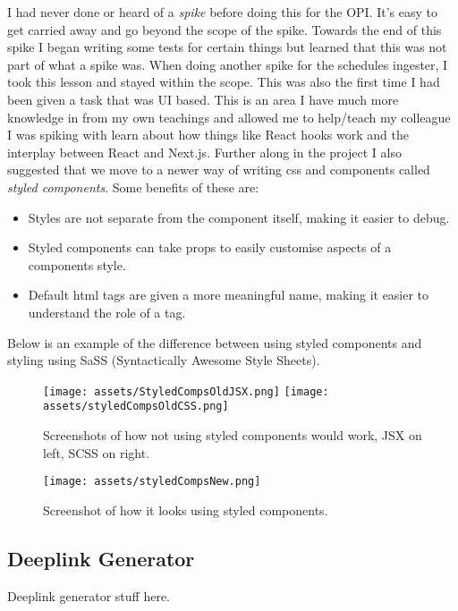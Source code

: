   \vspace{0.2cm}

  I had never done or heard of a \textit{spike} before doing this for the OPI. It's easy to get carried away and go beyond the scope of the spike.
  Towards the end of this spike I began writing some tests for certain things but learned that this was not part of what a spike was. When doing 
  another spike for the schedules ingester, I took this lesson and stayed within the scope. This was also the first time I had been given a task that
  was UI based. 
  This is an area I have much more knowledge in from my own teachings and allowed me to help/teach my colleague I was spiking with learn
  about how things like React hooks work and the interplay between React and Next.js.
  Further along in the project I also suggested that we move to a newer way of writing css and components called \textit{styled components}. Some benefits of
  these are:
  \begin{itemize}
    \item Styles are not separate from the component itself, making it easier to debug.
    \item Styled components can take props to easily customise aspects of a components style.
    \item Default html tags are given a more meaningful name, making it easier to understand the role of a tag.
  \end{itemize}

  Below is an example of the difference between using styled components and styling using SaSS (Syntactically Awesome Style Sheets).

  \begin{figure}[H]
    \centering
    \texttt{[image: assets/StyledCompsOldJSX.png]}
    \texttt{[image: assets/styledCompsOldCSS.png]}
    \caption{Screenshots of how not using styled components would work, JSX on left, SCSS on right.}
    \label{fig:oldStyling}
  \end{figure}

  \begin{figure}[H]
    \centering
    \texttt{[image: assets/styledCompsNew.png]}
    \caption{Screenshot of how it looks using styled components.}
    \label{fig:newStyling}
  \end{figure}

  \subsection{Deeplink Generator}
  Deeplink generator stuff here.

